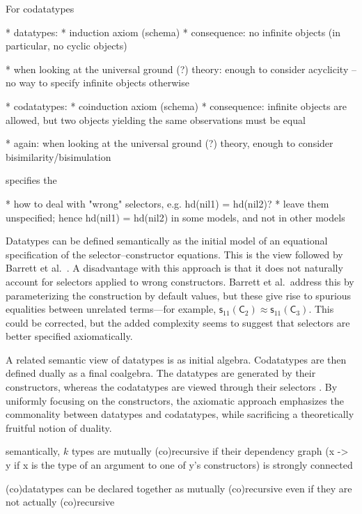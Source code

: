\documentclass[a4paper,oribibl,envcountsame,draft]{llncs}
\newcommand\const[1]{\textsf{#1}}
\newcommand{\teq}{\approx}
\begin{document}
For codatatypes

    * datatypes:
      * induction axiom (schema)
        * consequence: no infinite objects (in particular, no cyclic objects)

      * when looking at the universal ground (?) theory:
        enough to consider acyclicity -- no way to specify infinite objects
        otherwise

    * codatatypes:
      * coinduction axiom (schema)
        * consequence: infinite objects are allowed, but
          two objects yielding the same observations must be equal

      * again: when looking at the universal ground (?) theory, enough to
        consider bisimilarity/bisimulation

specifies the 



  * how to deal with "wrong" selectors, e.g.
        hd(nil1) = hd(nil2)?
      * leave them unspecified; hence hd(nil1) = hd(nil2) in some models,
        and not in other models




Datatypes can be defined semantically as the initial model of an equational
specification of the selector--constructor equations. This is the view followed
by Barrett et al.\ \cite{barrett-et-al-2010}. A disadvantage with this approach
is that it does not naturally account for selectors applied to wrong
constructors. Barrett et al.\ address this by parameterizing the construction by
default values, but these give rise to spurious equalities between unrelated
terms---for example, $\const{s}_{11}(\const{C}_2) \teq \const{s}_{11}(\const{C}_3)$.
This could be corrected, but the added
complexity seems to suggest that selectors are better specified axiomatically.

A related semantic view of datatypes is as initial algebra. Codatatypes are then
defined dually as a final coalgebra. The datatypes are generated by their
constructors, whereas the codatatypes are viewed through their selectors
\cite{xxx}. By uniformly focusing on the constructors, the axiomatic approach
emphasizes the commonality between datatypes and codatatypes, while sacrificing
a theoretically fruitful notion of duality.


    semantically, $k$ types are mutually (co)recursive if their dependency graph
    (x -> y if x is the type of an argument to one of y's constructors) is
    strongly connected

    (co)datatypes can be declared together as mutually (co)recursive even if
    they are not actually (co)recursive
\end{document}
